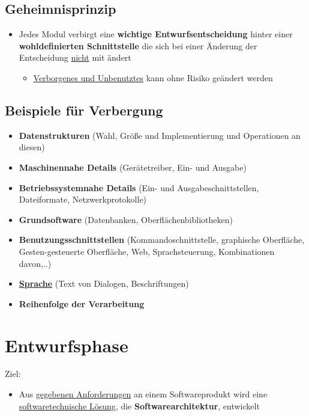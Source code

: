 \documentclass[parskip=full, 12pt]{scrartcl}
\begin{document}
		\subsection{Geheimnisprinzip}
		
			\begin{itemize}
				\item Jedes Modul verbirgt eine \textbf{wichtige Entwurfsentscheidung} hinter einer \textbf{wohldefinierten Schnittstelle} die sich bei einer Änderung der Entscheidung \underline{nicht} mit ändert
				\begin{itemize}
					\item \underline{Verborgenes und Unbenutztes} kann ohne Risiko geändert werden
				\end{itemize}
			\end{itemize}
		
		\subsection{Beispiele für Verbergung}
		
			\begin{itemize}
				\item \textbf{Datenstrukturen} (Wahl, Größe und Implementierung und Operationen an diesen)
				\item \textbf{Maschinennahe Details} (Gerätetreiber, Ein- und Ausgabe)
				\item \textbf{Betriebssystemnahe Details} (Ein- und Ausgabeschnittstellen, Dateiformate, Netzwerkprotokolle)
				\item \textbf{Grundsoftware} (Datenbanken, Oberflächenbibliotheken)
				\item \textbf{Benutzungsschnittstellen} (Kommandoschnittstelle, graphische Oberfläche, Gesten-gesteuerte Oberfläche, Web, Sprachsteuerung, Kombinationen davon,..)
				\item \textbf{\underline{Sprache}} (Text von Dialogen, Beschriftungen)
				\item \textbf{Reihenfolge der Verarbeitung}
			\end{itemize}
	
	\newpage
	\section{Entwurfsphase}
	
		Ziel:
		
		\begin{itemize}
			\item Aus \underline{gegebenen Anforderungen} an einem Softwareprodukt wird eine \newline \underline{softwaretechnische Lösung}, die \textbf{Softwarearchitektur}, entwickelt
		\end{itemize}
	
\end{document}
